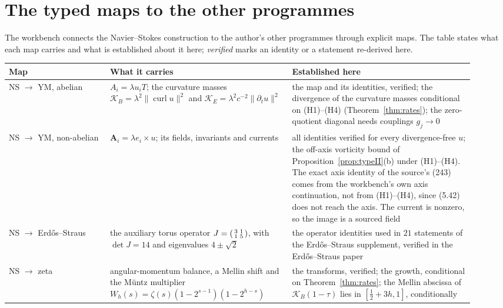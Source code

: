 \section{The typed maps to the other programmes}\label{sec:bridges}

The workbench connects the Navier--Stokes construction to the author's other programmes through explicit maps. The table states what each map carries and what is established about it here; \emph{verified} marks an identity or a statement re-derived here.

\begin{center}\small
\begin{longtable}{@{}>{\raggedright\arraybackslash}p{0.2\linewidth}>{\raggedright\arraybackslash}p{0.36\linewidth}>{\raggedright\arraybackslash}p{0.36\linewidth}@{}}
\toprule
Map & What it carries & Established here\\
\midrule
\endhead
NS $\to$ YM, abelian & $A_i=\lambda u_iT$; the curvature masses $\mathcal K_B=\lambda^2\|\operatorname{curl}u\|^2$ and $\mathcal K_E=\lambda^2c^{-2}\|\partial_tu\|^2$ & the map and its identities, verified; the divergence of the curvature masses conditional on (H1)--(H4) (Theorem~\ref{thm:rates}); the zero-quotient diagonal needs couplings $g_j\to0$\\
NS $\to$ YM, non-abelian & $\mathbf A_i=\lambda e_i\times u$; its fields, invariants and currents & all identities verified for every divergence-free $u$; the off-axis vorticity bound of Proposition~\ref{prop:typeII}(b) under (H1)--(H4). The exact axis identity of the source's (243) comes from the workbench's own axis continuation, not from (H1)--(H4), since (5.42) does not reach the axis. The current is nonzero, so the image is a sourced field\\
NS $\to$ Erdős--Straus & the auxiliary torus operator $J=\begin{psmallmatrix}3&1\\1&5\end{psmallmatrix}$, with $\det J=14$ and eigenvalues $4\pm\sqrt2$ & the operator identities used in $21$ statements of the Erdős--Straus supplement, verified in the Erdős--Straus paper \cite{ESPaper}\\
NS $\to$ zeta & angular-momentum balance, a Mellin shift and the Müntz multiplier $W_h(s)=\zeta(s)(1-2^{s-1})(1-2^{h-s})$ & the transforms, verified; the growth, conditional on Theorem~\ref{thm:rates}; the Mellin abscissa of $\mathcal K_B(1-\tau)$ lies in $[\frac12+3h,1]$, conditionally\\

\end{longtable}
\end{center}
